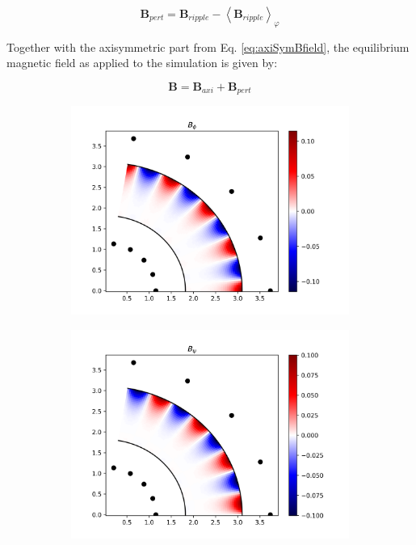 \begin{equation}
	\textbf{B}_{pert} = \textbf{B}_{ripple} - \left<\textbf{B}_{ripple}\right>_\varphi
\end{equation}


Together with the axisymmetric part from Eq. \ref{eq:axiSymBfield}, the equilibrium magnetic field as applied to the simulation is given by:

\begin{equation}
	\textbf{B} = \textbf{B}_{axi} + \textbf{B}_{pert}
\end{equation}

\begin{figure}[H]
	\centering
	\begin{subfigure}[t]{0.3\textwidth}
		\centering
		\includegraphics[width=1\textwidth]{schemes/rippleBphi.png}
		\label{fig:Bpert_phi}
	\end{subfigure}
	\begin{subfigure}[t]{0.3\textwidth}
		\centering
		\includegraphics[width=1\textwidth]{schemes/rippleBpsi.png}

\end{subfigure}
\end{figure}
